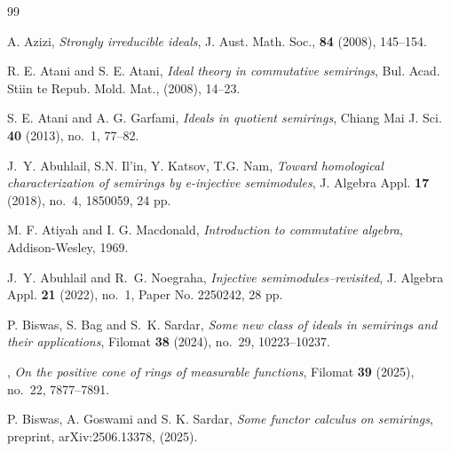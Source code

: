 \documentclass[11pt,leqno]{amsart}
\theoremstyle{definition}
\numberwithin{equation}{section}
\begin{document}
\begin{thebibliography}{99}


 A. Azizi, \textit{Strongly irreducible ideals}, J. Aust. Math. Soc., \textbf{84} (2008), 145--154.

 R. E. Atani and S. E. Atani, \textit{Ideal theory in commutative semirings}, Bul. Acad. Stiin te Repub. Mold. Mat., (2008), 14--23.

 S. E. Atani and A. G. Garfami, \textit{Ideals in quotient semirings}, Chiang Mai J. Sci. {\bf 40} (2013), no.~1, 77--82.

 J.~Y. Abuhlail, S.N. Il'in, Y. Katsov, T.G. Nam, \textit{Toward homological characterization of semirings by e-injective semimodules}, J. Algebra Appl. {\bf 17} (2018), no.~4, 1850059, 24 pp.

 M. F. Atiyah and I. G. Macdonald, \textit{Introduction to commutative algebra}, Addison-Wesley, 1969.

 J.~Y. Abuhlail and R.~G. Noegraha, \textit{Injective semimodules--revisited}, J. Algebra Appl. {\bf 21} (2022), no.~1, Paper No. 2250242, 28 pp.



 P. Biswas, S. Bag and S.~K. Sardar, \textit{Some new class of ideals in semirings and their applications}, Filomat {\bf 38} (2024), no.~29, 10223--10237.

 \bysame, \textit{On the positive cone of rings of measurable functions}, Filomat {\bf 39} (2025), no.~22, 7877--7891.

 P. Biswas, A. Goswami and S. K. Sardar, \textit{Some functor calculus on semirings}, preprint, arXiv:2506.13378, (2025).



\end{thebibliography}
\end{document}
